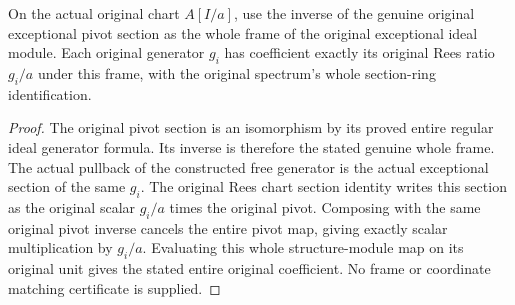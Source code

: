 \begin{lemma}
\label{lem:kn-nadel-nef-big-exceptional-coefficients}
\leanok
{}
On the actual original chart $A[I/a]$, use the inverse of the genuine
original exceptional pivot section as the whole frame of the original
exceptional ideal module. Each original generator $g_i$ has coefficient
exactly its original Rees ratio $g_i/a$ under this frame, with the original
spectrum's whole section-ring identification.
\end{lemma}
\begin{proof}
The original pivot section is an isomorphism by its proved entire regular
ideal generator formula. Its inverse is therefore the stated genuine
whole frame. The actual pullback of the constructed free generator is
the actual exceptional section of the same $g_i$. The original Rees
chart section identity writes this section as the original scalar
$g_i/a$ times the original pivot. Composing with the same original
pivot inverse cancels the entire pivot map, giving exactly scalar
multiplication by $g_i/a$. Evaluating this whole structure-module map
on its original unit gives the stated entire original coefficient.
No frame or coordinate matching certificate is supplied.
\end{proof}

